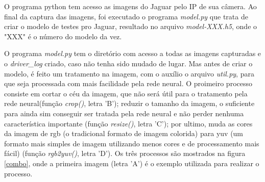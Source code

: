 	\begin{figure}[H]
		\centering
\end{figure}

O programa python tem acesso as imagens do Jaguar pelo IP de sua câmera. Ao final da captura das imagens, foi executado o programa \textit{model.py} que trata de criar o modelo de testes pro Jaguar, resultado no arquivo \textit{model-XXX.h5}, onde o "XXX" é o número do modelo da vez.

O programa \textit{model.py} tem o diretório com acesso a todas as imagens capturadas e o \textit{driver\_log} criado, caso não tenha sido mudado de lugar. Mas antes de criar o modelo, é feito um tratamento na imagem, com o auxílio o arquivo \textit{util.py}, para que seja processada com mais facilidade pela rede neural. O proimeiro processo consiste em cortar o céu da imagem, que não será útil para o tratamento pela rede neural(função \textit{crop()}, letra 'B'); reduzir o tamanho da imagem, o suficiente para ainda sim conseguir ser tratada pela rede neural e não perder nenhuma característica importante (função \textit{resize()}, letra 'C'); por ultimo, muda as cores da imagem de rgb (o tradicional formato de imagem colorida) para yuv (um formato mais simples de imagem utilizando menos cores e de processamento mais fácil) (função \textit{rgb2yuv()}, letra 'D'). Os três processos são mostrados na figura \ref{combo}, onde a primeira imagem (letra 'A') é o exemplo utilizada para realizar o processo.

